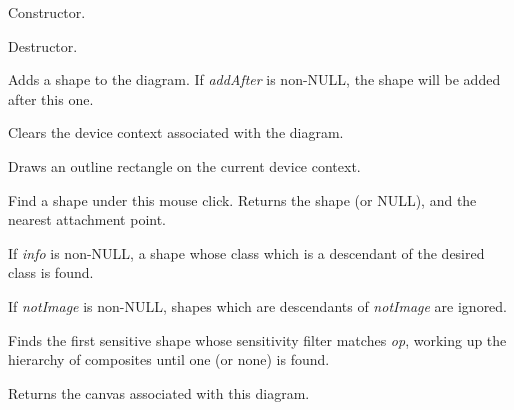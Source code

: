 Constructor.



Destructor.



Adds a shape to the diagram. If {\it addAfter} is non-NULL, the shape will be added after this
one.



Clears the device context associated with the diagram.



Draws an outline rectangle on the current device context.



Find a shape under this mouse click. Returns the shape (or NULL), and the nearest attachment point.

If {\it info} is non-NULL, a shape whose class which is a descendant of the desired class is found.

If {\it notImage} is non-NULL, shapes which are descendants of {\it notImage} are ignored.



Finds the first sensitive shape whose sensitivity filter matches {\it op}, working up the hierarchy of composites until
one (or none) is found.



Returns the canvas associated with this diagram.

